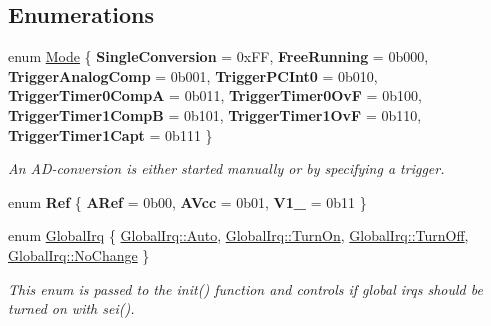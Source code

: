 \subsection*{Enumerations}
\begin{DoxyCompactItemize}
\item 
enum \hyperlink{namespaceadc_a8094fa55ea1a7729bb35c230163c0f8f}{Mode} \{ \newline
{\bfseries Single\+Conversion} = 0x\+FF, 
\newline
{\bfseries Free\+Running} = 0b000, 
\newline
{\bfseries Trigger\+Analog\+Comp} = 0b001, 
\newline
{\bfseries Trigger\+P\+C\+Int0} = 0b010, 
\newline
{\bfseries Trigger\+Timer0\+CompA} = 0b011, 
\newline
{\bfseries Trigger\+Timer0\+OvF} = 0b100, 
\newline
{\bfseries Trigger\+Timer1\+CompB} = 0b101, 
\newline
{\bfseries Trigger\+Timer1\+OvF} = 0b110, 
\newline
{\bfseries Trigger\+Timer1\+Capt} = 0b111
 \}\begin{DoxyCompactList}\small\item\em An A\+D-\/conversion is either started manually or by specifying a trigger. \end{DoxyCompactList}
\item 
\hypertarget{namespaceadc_adcbc814e47ddcec8104b574b02228d97}{}\label{namespaceadc_adcbc814e47ddcec8104b574b02228d97} 
enum {\bfseries Ref} \{ \newline
{\bfseries A\+Ref} = 0b00, 
\newline
{\bfseries A\+Vcc} = 0b01, 
\newline
{\bfseries V1\+\_} = 0b11
 \}
\item 
enum \hyperlink{namespaceadc_a92c3b192926a98ab7106f26c73bf85bb}{Global\+Irq} \{ \newline
\hyperlink{namespaceadc_a92c3b192926a98ab7106f26c73bf85bba06b9281e396db002010bde1de57262eb}{Global\+Irq\+::\+Auto}, 
\newline
\hyperlink{namespaceadc_a92c3b192926a98ab7106f26c73bf85bbace5a9f99f26d20a3bb29810a8716ae11}{Global\+Irq\+::\+Turn\+On}, 
\newline
\hyperlink{namespaceadc_a92c3b192926a98ab7106f26c73bf85bbaf0635e226d94e6a8339e6f237c2b6f1b}{Global\+Irq\+::\+Turn\+Off}, 
\newline
\hyperlink{namespaceadc_a92c3b192926a98ab7106f26c73bf85bba4bac8cdf0a968472b519b3b295d0d48b}{Global\+Irq\+::\+No\+Change}
 \}\begin{DoxyCompactList}\small\item\em This enum is passed to the {\ttfamily init()} function and controls if global irqs should be turned on with {\ttfamily sei()}. \end{DoxyCompactList}
\end{DoxyCompactItemize}
